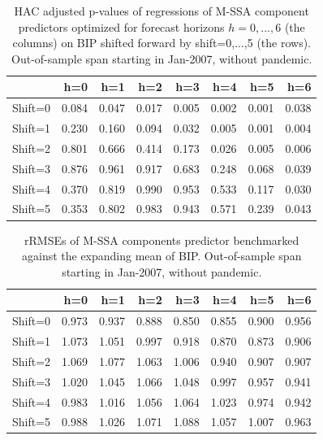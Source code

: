 \documentclass[a4paper]{article}
\begin{document}
\begin{table}[ht]
\centering
\begin{tabular}{rrrrrrrr}
  \hline
 & h=0 & h=1 & h=2 & h=3 & h=4 & h=5 & h=6 \\ 
  \hline
Shift=0 & 0.084 & 0.047 & 0.017 & 0.005 & 0.002 & 0.001 & 0.038 \\ 
  Shift=1 & 0.230 & 0.160 & 0.094 & 0.032 & 0.005 & 0.001 & 0.004 \\ 
  Shift=2 & 0.801 & 0.666 & 0.414 & 0.173 & 0.026 & 0.005 & 0.006 \\ 
  Shift=3 & 0.876 & 0.961 & 0.917 & 0.683 & 0.248 & 0.068 & 0.039 \\ 
  Shift=4 & 0.370 & 0.819 & 0.990 & 0.953 & 0.533 & 0.117 & 0.030 \\ 
  Shift=5 & 0.353 & 0.802 & 0.983 & 0.943 & 0.571 & 0.239 & 0.043 \\ 
   \hline
\end{tabular}
\caption{HAC adjusted p-values of regressions of M-SSA component predictors optimized for forecast horizons $h=0,...,6$  (the columns) on BIP shifted forward by shift=0,...,5 (the rows). Out-of-sample span starting in Jan-2007, without pandemic.} 
\label{p_val_wc5}
\end{table}%
\begin{table}[ht]
\centering
\begin{tabular}{rrrrrrrr}
  \hline
 & h=0 & h=1 & h=2 & h=3 & h=4 & h=5 & h=6 \\ 
  \hline
Shift=0 & 0.973 & 0.937 & 0.888 & 0.850 & 0.855 & 0.900 & 0.956 \\ 
  Shift=1 & 1.073 & 1.051 & 0.997 & 0.918 & 0.870 & 0.873 & 0.906 \\ 
  Shift=2 & 1.069 & 1.077 & 1.063 & 1.006 & 0.940 & 0.907 & 0.907 \\ 
  Shift=3 & 1.020 & 1.045 & 1.066 & 1.048 & 0.997 & 0.957 & 0.941 \\ 
  Shift=4 & 0.983 & 1.016 & 1.056 & 1.064 & 1.023 & 0.974 & 0.942 \\ 
  Shift=5 & 0.988 & 1.026 & 1.071 & 1.088 & 1.057 & 1.007 & 0.963 \\ 
   \hline
\end{tabular}
\caption{rRMSEs of M-SSA components predictor benchmarked against the expanding mean of BIP. Out-of-sample span starting in Jan-2007, without pandemic.} 
\label{rRMSE_mSSA_comp_mean6}
\end{table}%
\end{document}
